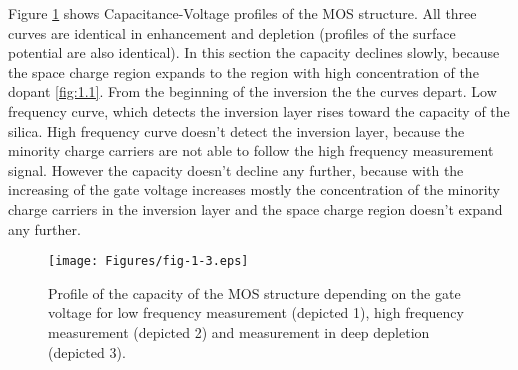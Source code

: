 \iffalse
\par Na obrázku \ref{fig:1.3} sú znázornené kapacitne-napäťové
závislosti štruktúry MOS. Všetky tri krivky majú spoločný priebeh v
oblasti obohatenia a ochudobnenia (spoločný priebeh majú aj krivky
povrchového potenciálu). V tejto časti klesá kapacita pomaly, pretože
oblasť priestorového náboja sa rozpína cez oblasť s vysokou
koncentráciou prímesí (obr.1.1). Od počiatku inverzie sa krivky
rozdeľujú. Nízkofrekvenčná krivka, ktorá zaznamenáva inverznú vrstvu,
stúpa až ku kapacite oxidu. Vysokofrekvenčná krivka nezaznamenáva
inverznú vrstvu, pretože minoritné nosiče nestačia sledovať
vysokofrekvenčný merací signál, avšak kapacita už ďalej neklesá,
pretože so zvyšovaním napätia hradla sa zvyšuje prevážne koncentrácia
minoritných nosičov v inverznej vrstve a oblasť priestorového náboja
sa ďalej nerozpína.
\fi
\par Figure \ref{fig:1.3} shows Capacitance-Voltage profiles of the
MOS structure. All three curves are identical in enhancement and
depletion (profiles of the surface potential are also identical). In
this section the capacity declines slowly, because the space charge
region expands to the region with high concentration of the dopant
\ref{fig:1.1}. From the beginning of the inversion the the curves
depart. Low frequency curve, which detects the inversion layer rises
toward the capacity of the silica. High frequency curve doesn't detect
the inversion layer, because the minority charge carriers are not able
to follow the high frequency measurement signal. However the capacity
doesn't decline any further, because with the increasing of the gate
voltage increases mostly the concentration of the minority charge
carriers in the inversion layer and the space charge region doesn't
expand any further.

\begin{figure}[h!]\centering
\texttt{[image: Figures/fig-1-3.eps]}
\captionsetup{justification=raggedright, singlelinecheck=false}
\iffalse
\caption[Priebeh kapacity štruktúry MOS v závislosti od napätia
  hradla]{Priebeh kapacity štruktúry MOS v závislosti od napätia
  hradla pre nízkofrekvenčné meranie (označené 1), vysokofrekvenčné
  meranie (označené 2) a meranie v stave hlbokého ochudobnenia
  (označené 3).}
\fi
\caption[Profile of the capacity of the MOS structure depending on the
  gate voltage]{Profile of the capacity of the MOS structure depending
  on the gate voltage for low frequency measurement (depicted 1), high
  frequency measurement (depicted 2) and measurement in deep depletion
  (depicted 3).}
\label{fig:1.3}
\end{figure}

